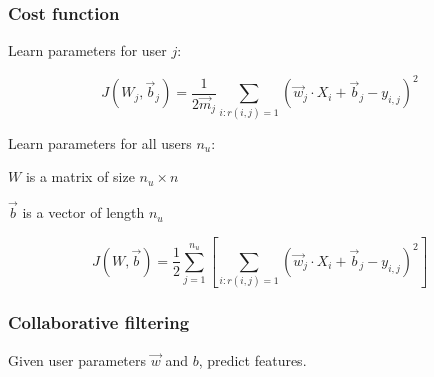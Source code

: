 \documentclass[12pt]{article}
\begin{document}
\subsubsection{Cost function}

Learn parameters for user $j$:

\[ J(W_j,\vec{b}_j) = \frac{1}{2\vec m_j} \sum_{i:r(i,j)=1} (\vec w_j \cdot X_i + \vec b_j - y_{i,j})^2 \]

Learn parameters for all users $n_u$:

$W$ is a matrix of size $n_u \times n$

$\vec{b}$ is a vector of length $n_u$

\[ J(W,\vec{b}) = \frac{1}{2} \sum_{j=1}^{n_u} \left[ \sum_{i:r(i,j)=1} (\vec{w}_j \cdot X_i + \vec b_j - y_{i,j})^2 \right] \]

\subsubsection{Collaborative filtering}

Given user parameters $\vec{w}$ and $b$, predict features.
\end{document}
